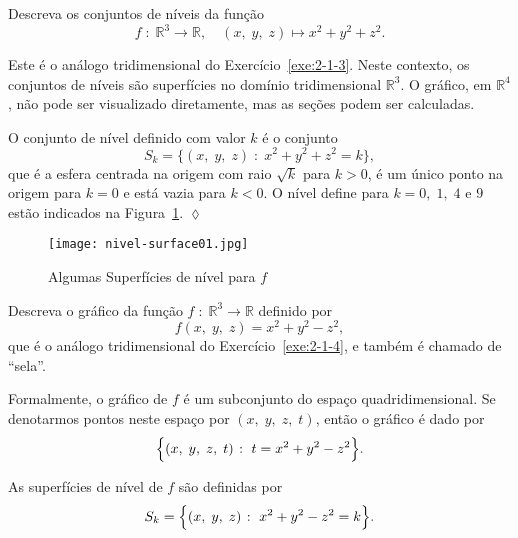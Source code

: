 \begin{exer}\label{exe:2-1-5}
	Descreva os conjuntos de níveis da função
	\begin{equation*}
		f \; \colon \;  \mathbb{R}^{3} \to \mathbb{R}, \quad (x,\; y,\; z)\mapsto x^{2}+y^{2}+z^{2}.
	\end{equation*}	
\end{exer}

\solo
Este é o análogo tridimensional do Exercício~\ref{exe:2-1-3}. Neste contexto, os conjuntos de níveis são superfícies no domínio tridimensional \(\mathbb{R}^{3}\). O gráfico, em 
\(\mathbb{R}^{4}\), não pode ser visualizado diretamente, mas as seções podem ser calculadas.

O conjunto de nível definido com valor \(k\) é o conjunto
\begin{equation*}
	S_{k} = \Bigr\{(x,\; y,\; z)\; \colon \; x^{2}+y^{2}+z^{2}=k \Bigr\},
\end{equation*}
que é a esfera centrada na origem com raio \(\sqrt{k}\) para \(k > 0\), é um único ponto na origem para \(k=0\) e está vazia para \(k<0\). O nível define para 
\(k = 0,\; 1,\; 4\) e \(9\) estão indicados na  Figura~\ref{fig:2-1-12}. \hfill \(\lozenge\)
% 
\begin{figure}[H]
	\centering
	\texttt{[image: nivel-surface01.jpg]}
	\caption{Algumas Superfícies de nível para \(f\)}
	\label{fig:2-1-12}
\end{figure}
%

\begin{exer} \label{exe:2-1-6}
	Descreva o gráfico da função \(f\;\colon \; \mathbb{R}^{3}\to  \mathbb{R}\) definido por
	\begin{equation*}
		f(x,\; y,\; z) = x^2+y^2-z^2,
	\end{equation*}
	que é o análogo tridimensional do Exercício~\ref{exe:2-1-4}, e também é chamado de ``sela''.	
\end{exer}

\solo
Formalmente, o gráfico de \(f\) é um subconjunto do espaço quadridimensional. Se denotarmos pontos neste espaço por \((x,\;y,\; z,\; t)\), então o gráfico é dado por
\begin{equation*}
	\Bigl\{(x,\; y,\; z,\; t)\; \colon \;  t =x^2+y^2-z^2\Bigr\}.
\end{equation*}

As superfícies de nível de \(f\) são definidas por
\begin{equation*}
	S_{k} = \Bigl\{(x,\; y,\; z)\; \colon \; x^2+y^2-z^2 = k \Bigl\}.
\end{equation*}

